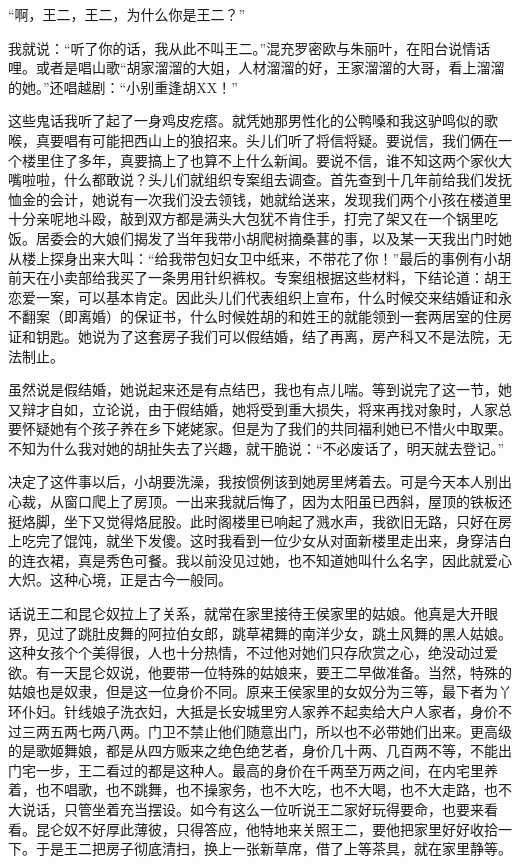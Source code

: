 “啊，王二，王二，为什么你是王二？” 

我就说：“听了你的话，我从此不叫王二。”混充罗密欧与朱丽叶，在阳台说情话哩。或者是唱山歌“胡家溜溜的大姐，人材溜溜的好，王家溜溜的大哥，看上溜溜的她。”还唱越剧：“小别重逢胡XX！” 

这些鬼话我听了起了一身鸡皮疙瘩。就凭她那男性化的公鸭嗓和我这驴鸣似的歌喉，真要唱有可能把西山上的狼招来。头儿们听了将信将疑。要说信，我们俩在一个楼里住了多年，真要搞上了也算不上什么新闻。要说不信，谁不知这两个家伙大嘴啦啦，什么都敢说？头儿们就组织专案组去调查。首先查到十几年前给我们发抚恤金的会计，她说有一次我们没去领钱，她就给送来，发现我们两个小孩在楼道里十分亲呢地斗殴，敲到双方都是满头大包犹不肯住手，打完了架又在一个锅里吃饭。居委会的大娘们揭发了当年我带小胡爬树摘桑葚的事，以及某一天我出门时她从楼上探身出来大叫：“给我带包妇女卫中纸来，不带花了你！”最后的事例有小胡前天在小卖部给我买了一条男用针织裤权。专案组根据这些材料，下结论道：胡王恋爱一案，可以基本肯定。因此头儿们代表组织上宣布，什么时候交来结婚证和永不翻案（即离婚）的保证书，什么时候姓胡的和姓王的就能领到一套两居室的住房证和钥匙。她说为了这套房子我们可以假结婚，结了再离，房产科又不是法院，无法制止。 

虽然说是假结婚，她说起来还是有点结巴，我也有点儿喘。等到说完了这一节，她又辩才自如，立论说，由于假结婚，她将受到重大损失，将来再找对象时，人家总要怀疑她有个孩子养在乡下姥姥家。但是为了我们的共同福利她已不惜火中取栗。不知为什么我对她的胡扯失去了兴趣，就干脆说：“不必废话了，明天就去登记。” 

决定了这件事以后，小胡要洗澡，我按惯例该到她房里烤着去。可是今天本人别出心裁，从窗口爬上了房顶。一出来我就后悔了，因为太阳虽已西斜，屋顶的铁板还挺烙脚，坐下又觉得烙屁股。此时阁楼里已响起了溅水声，我欲旧无路，只好在房上吃完了馄饨，就坐下发傻。这时我看到一位少女从对面新楼里走出来，身穿洁白的连衣裙，真是秀色可餐。我以前没见过她，也不知道她叫什么名字，因此就爱心大炽。这种心境，正是古今一般同。 

话说王二和昆仑奴拉上了关系，就常在家里接待王侯家里的姑娘。他真是大开眼界，见过了跳肚皮舞的阿拉伯女郎，跳草裙舞的南洋少女，跳土风舞的黑人姑娘。这种女孩个个美得很，人也十分热情，不过他对她们只存欣赏之心，绝没动过爱欲。有一天昆仑奴说，他要带一位特殊的姑娘来，要王二早做准备。当然，特殊的姑娘也是奴隶，但是这一位身价不同。原来王侯家里的女奴分为三等，最下者为丫环仆妇。针线娘子洗衣妇，大抵是长安城里穷人家养不起卖给大户人家者，身价不过三两五两七两八两。门卫不禁止他们随意出门，所以也不必带她们出来。更高级的是歌姬舞娘，都是从四方贩来之绝色绝艺者，身价几十两、几百两不等，不能出门宅一步，王二看过的都是这种人。最高的身价在千两至万两之间，在内宅里养着，也不唱歌，也不跳舞，也不操家务，也不大吃，也不大喝，也不大走路，也不大说话，只管坐着充当摆设。如今有这么一位听说王二家好玩得要命，也要来看看。昆仑奴不好厚此薄彼，只得答应，他特地来关照王二，要他把家里好好收拾一下。于是王二把房子彻底清扫，换上一张新草席，借了上等茶具，就在家里静等。 

